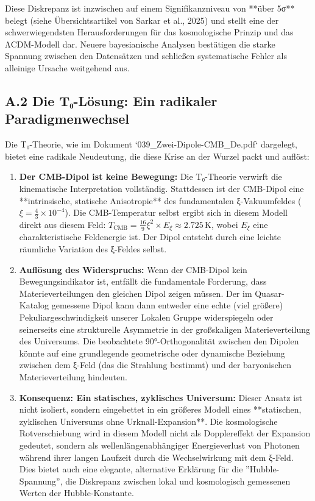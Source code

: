 \documentclass[12pt,a4paper]{article}
\begin{document}
	Diese Diskrepanz ist inzwischen auf einem Signifikanzniveau von **über 5σ** belegt (siehe Übersichtsartikel von Sarkar et al., 2025) und stellt eine der schwerwiegendsten Herausforderungen für das kosmologische Prinzip und das ΛCDM-Modell dar. Neuere bayesianische Analysen bestätigen die starke Spannung zwischen den Datensätzen und schließen systematische Fehler als alleinige Ursache weitgehend aus.
	
	\subsection*{A.2 Die T₀-Lösung: Ein radikaler Paradigmenwechsel}
	
	Die T₀-Theorie, wie im Dokument `039\_Zwei-Dipole-CMB\_De.pdf` dargelegt, bietet eine radikale Neudeutung, die diese Krise an der Wurzel packt und auflöst:
	
	\begin{enumerate}
		\item \textbf{Der CMB-Dipol ist keine Bewegung:} Die T₀-Theorie verwirft die kinematische Interpretation vollständig. Stattdessen ist der CMB-Dipol eine **intrinsische, statische Anisotropie** des fundamentalen ξ-Vakuumfeldes ($ \xi = \frac{4}{3} \times 10^{-4} $). Die CMB-Temperatur selbst ergibt sich in diesem Modell direkt aus diesem Feld: $ T_{\text{CMB}} = \frac{16}{9} \xi^2 \times E_\xi \approx 2.725 \, \text{K} $, wobei $E_\xi$ eine charakteristische Feldenergie ist. Der Dipol entsteht durch eine leichte räumliche Variation des ξ-Feldes selbst.
		
		\item \textbf{Auflösung des Widerspruchs:} Wenn der CMB-Dipol kein Bewegungsindikator ist, entfällt die fundamentale Forderung, dass Materieverteilungen den gleichen Dipol zeigen müssen. Der im Quasar-Katalog gemessene Dipol kann dann entweder eine echte (viel größere) Pekuliargeschwindigkeit unserer Lokalen Gruppe widerspiegeln oder seinerseits eine strukturelle Asymmetrie in der großskaligen Materieverteilung des Universums. Die beobachtete 90°-Orthogonalität zwischen den Dipolen könnte auf eine grundlegende geometrische oder dynamische Beziehung zwischen dem ξ-Feld (das die Strahlung bestimmt) und der baryonischen Materieverteilung hindeuten.
		
		\item \textbf{Konsequenz: Ein statisches, zyklisches Universum:} Dieser Ansatz ist nicht isoliert, sondern eingebettet in ein größeres Modell eines **statischen, zyklischen Universums ohne Urknall-Expansion**. Die kosmologische Rotverschiebung wird in diesem Modell nicht als Dopplereffekt der Expansion gedeutet, sondern als wellenlängenabhängiger Energieverlust von Photonen während ihrer langen Laufzeit durch die Wechselwirkung mit dem ξ-Feld. Dies bietet auch eine elegante, alternative Erklärung für die ''Hubble-Spannung'', die Diskrepanz zwischen lokal und kosmologisch gemessenen Werten der Hubble-Konstante.
	\end{enumerate}
	
\end{document}
